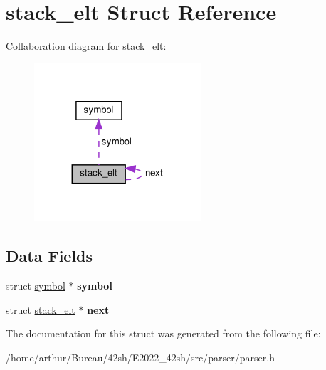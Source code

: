\hypertarget{structstack__elt}{}\section{stack\+\_\+elt Struct Reference}
\label{structstack__elt}


Collaboration diagram for stack\+\_\+elt\+:
\nopagebreak
\begin{figure}[H]
\begin{center}
\leavevmode
\includegraphics[width=176pt]{structstack__elt__coll__graph}
\end{center}
\end{figure}
\subsection*{Data Fields}
\begin{DoxyCompactItemize}
\item 
\mbox{\label{structstack__elt_ae426684f2e44465ca4358053ac0d6868}} 
struct \hyperlink{structsymbol}{symbol} $\ast$ {\bfseries symbol}
\item 
\mbox{\label{structstack__elt_a3acadb85f0b974b5ec94ebeb1dc18a3a}} 
struct \hyperlink{structstack__elt}{stack\+\_\+elt} $\ast$ {\bfseries next}
\end{DoxyCompactItemize}


The documentation for this struct was generated from the following file\+:\begin{DoxyCompactItemize}
\item 
/home/arthur/\+Bureau/42sh/\+E2022\+\_\+42sh/src/parser/parser.\+h\end{DoxyCompactItemize}
